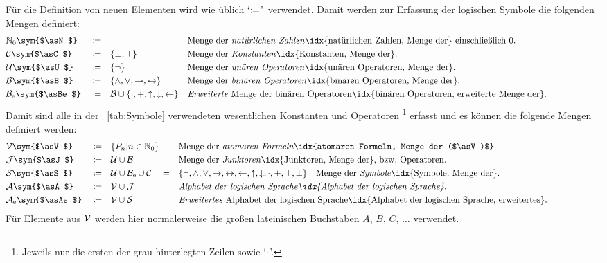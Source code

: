 \documentclass[english,ngerman,parskip=half,headsepline,footsepline,
	fleqn,notitlepage]{scrreprt}
\makeatletter
\newcommand*{\Sym}[1]{#1\sym{$#1$}}%
\newcommand*{\formulatoleft}{&&&&&&&&&&}%
\newcommand*{\charqt}[1]{\enquote*{#1}}%
\newcommand*{\symqt}[1]{\charqt{$#1$}}%
\newcommand*{\textbzw}{bzw.\@ }
\makeatother
\begin{document}
	Für die Definition von neuen Elementen
	wird wie üblich \symqt{\defeq}\ verwendet.
	Damit werden zur Erfassung der logischen Symbole
	die folgenden Mengen definiert:
	\begin{align}
		& \Sym{\asN}  & & \defeq & &
		& & \textrm{Menge der \emph{natürlichen Zahlen}%
		\idx{natürlichen Zahlen, Menge der} einschließlich 0.} \label{def:N} \\
		& \Sym{\asC}  & & \defeq & & \{ \lfalse, \ltrue \}
		& & \textrm{Menge der \emph{Konstanten}%
		\idx{Konstanten, Menge der}.}                          \label{def:C} \\
		& \Sym{\asU}  & & \defeq & & \{ \lnot \}
		& & \textrm{Menge der \emph{unären Operatoren}%
		\idx{unären Operatoren, Menge der}.}                   \label{def:U} \\
		& \Sym{\asB}  & & \defeq & & \{ \land, \lor, \limp, \lequiv \}
		& & \textrm{Menge der \emph{binären Operatoren}%
		\idx{binären Operatoren, Menge der}.}                  \label{def:B} \\
		& \Sym{\asBe} & & \defeq & & \asB\cup\{\lmult,\ladd,\lnand,\lnor,\lrep\}
		& & \textrm{\emph{Erweiterte} Menge der binären Operatoren%
		\idx{binären Operatoren, erweiterte Menge der}.}       \label{def:Be}
		\formulatoleft
	\end{align}
	Damit sind alle in der \tablename~\vref{tab:Symbole} verwendeten
	wesentlichen Konstanten und Operatoren%
	\footnote{%
		Jeweils nur die ersten der grau hinterlegten Zeilen sowie \symqt{\lmult}.%
	}
	erfasst und es können die folgende Mengen definiert werden:
	\begin{align}
		& \Sym{\asV}  & & \defeq & & \{ P_n | n \in \asN \}
		& & \textrm{Menge der \emph{atomaren Formeln}%
		\idx{atomaren Formeln, Menge der ($\asV)$}}          \label{def:V} \\
		& \Sym{\asJ}  & & \defeq & & \asU \cup \asB
		& & \textrm{Menge der \emph{Junktoren}%
		\idx{Junktoren, Menge der}, \textbzw Operatoren.}  \label{def:J} \\
		& \Sym{\asS}  & & \defeq & & \asU \cup \asBe\cup\asC \quad =
		& & \{ \lnot, \land, \lor, \limp, \lequiv, \lrep, \lnand, \lnor, \lmult,
		\ladd, \ltrue, \lfalse \} \quad \textrm{Menge der \emph{Symbole}%
		\idx{Symbole, Menge der}.}                          \label{def:S} \\
		& \Sym{\asA}  & & \defeq & & \asV \cup \asJ
		& & \textrm{\emph{Alphabet der logischen Sprache%
		\idx{Alphabet der logischen Sprache}}.}             \label{def:A} \\
		& \Sym{\asAe} & & \defeq & & \asV \cup \asS
		& & \textrm{\emph{Erweitertes} Alphabet der logischen Sprache%
		\idx{Alphabet der logischen Sprache, erweitertes}.} \label{def:Ae}
		\formulatoleft
	\end{align}
	Für Elemente aus $\mathcal{V}$ werden hier normalerweise
	die großen lateinischen Buchstaben $A$, $B$, $C$, $\dots$ verwendet.
\end{document}
